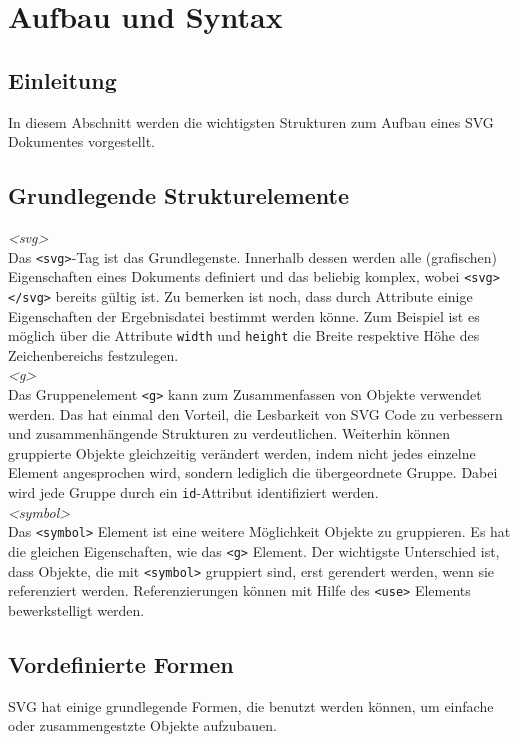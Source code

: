 \section{Aufbau und Syntax}
\subsection{Einleitung}
In diesem Abschnitt werden die wichtigsten Strukturen zum Aufbau eines SVG Dokumentes vorgestellt.
\subsection{Grundlegende Strukturelemente}
\emph{<svg>}\\
 Das \texttt{<svg>}-Tag ist das Grundlegenste. Innerhalb dessen werden alle (grafischen) Eigenschaften eines Dokuments definiert und das beliebig komplex, wobei \texttt{<svg> </svg>} bereits gültig ist. Zu bemerken ist noch, dass durch Attribute einige Eigenschaften der Ergebnisdatei bestimmt werden könne. Zum Beispiel ist es möglich über die Attribute \texttt{width} und \texttt{height} die Breite respektive Höhe des Zeichenbereichs festzulegen.\\
 
\emph{<g>}\\
 Das Gruppenelement \texttt{<g>} kann zum Zusammenfassen von Objekte verwendet werden. Das hat einmal den Vorteil, die Lesbarkeit von SVG Code zu verbessern und zusammenhängende Strukturen zu verdeutlichen. Weiterhin können gruppierte Objekte gleichzeitig verändert werden, indem nicht jedes einzelne Element angesprochen wird, sondern lediglich die übergeordnete Gruppe. Dabei wird jede Gruppe durch ein \texttt{id}-Attribut identifiziert werden.\\
 
\emph{<symbol>}\\
 Das \texttt{<symbol>} Element ist eine weitere Möglichkeit Objekte zu gruppieren. Es hat die gleichen Eigenschaften, wie das \texttt{<g>} Element. Der wichtigste Unterschied ist, dass Objekte, die mit \texttt{<symbol>} gruppiert sind, erst gerendert werden, wenn sie referenziert werden. Referenzierungen können mit Hilfe des \texttt{<use>} Elements bewerkstelligt werden.
 
 \subsection{Vordefinierte Formen}\label{basic_shapes}
 SVG hat einige grundlegende Formen, die benutzt werden können, um einfache oder zusammengestzte Objekte aufzubauen.\\
 
